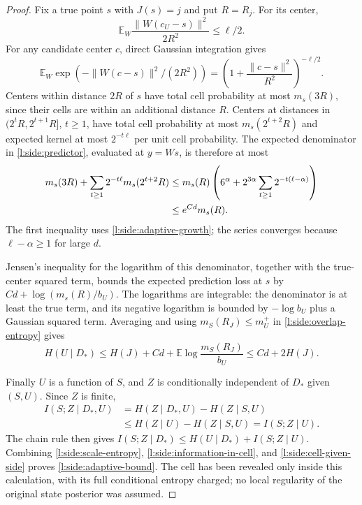 \begin{proof}
Fix a true point $s$ with $J(s)=j$ and put $R=R_j$.  For its center,
\[
 \mathbb E_W\frac{\|W(c_U-s)\|^2}{2R^2}\le\ell/2.
\]
For any candidate center $c$, direct Gaussian integration gives
\[
 \mathbb E_W\exp(-\|W(c-s)\|^2/(2R^2))
 =\left(1+\frac{\|c-s\|^2}{R^2}\right)^{-\ell/2}.
\]
Centers within distance $2R$ of $s$ have total cell probability at most
$m_s(3R)$, since their cells are within an additional distance $R$.
Centers at distances in $(2^tR,2^{t+1}R]$, $t\ge1$, have total cell
probability at most $m_s(2^{t+2}R)$ and expected kernel at most
$2^{-t\ell}$ per unit cell probability.  The expected denominator in
\eqref{l:side:predictor}, evaluated at $y=Ws$, is therefore at most
\begin{align}
 m_s(3R)+\sum_{t\ge1}2^{-t\ell}m_s(2^{t+2}R)
 &\le m_s(R)\left(6^\alpha+
       2^{3\alpha}\sum_{t\ge1}2^{-t(\ell-\alpha)}\right)\notag\\
 &\le e^{Cd}m_s(R).
 \label{l:side:shells}
\end{align}
The first inequality uses \eqref{l:side:adaptive-growth}; the series
converges because $\ell-\alpha\ge1$ for large $d$.

Jensen's inequality for the logarithm of this denominator, together
with the true-center squared term, bounds the expected prediction loss
at $s$ by $Cd+\log(m_s(R)/b_U)$.  The logarithms are integrable: the
denominator is at least the true term, and its negative logarithm is
bounded by $-\log b_U$ plus a Gaussian squared term.  Averaging and using
$m_S(R_J)\le m_U^+$ in \eqref{l:side:overlap-entropy} gives
\begin{equation}\label{l:side:cell-given-side}
 H(U\mid D_*)
 \le H(J)+Cd+\mathbb E\log\frac{m_S(R_J)}{b_U}
 \le Cd+2H(J).
\end{equation}

Finally $U$ is a function of $S$, and $Z$ is conditionally independent
of $D_*$ given $(S,U)$.  Since $Z$ is finite,
\begin{align*}
 I(S;Z\mid D_*,U)
 &=H(Z\mid D_*,U)-H(Z\mid S,U)\\
 &\le H(Z\mid U)-H(Z\mid S,U)=I(S;Z\mid U).
\end{align*}
The chain rule then gives
$I(S;Z\mid D_*)\le H(U\mid D_*)+I(S;Z\mid U)$.
Combining \eqref{l:side:scale-entropy},
\eqref{l:side:information-in-cell}, and
\eqref{l:side:cell-given-side} proves \eqref{l:side:adaptive-bound}.
The cell has been revealed only inside this calculation, with its full
conditional entropy charged; no local regularity of the original
state posterior was assumed.
\end{proof}

